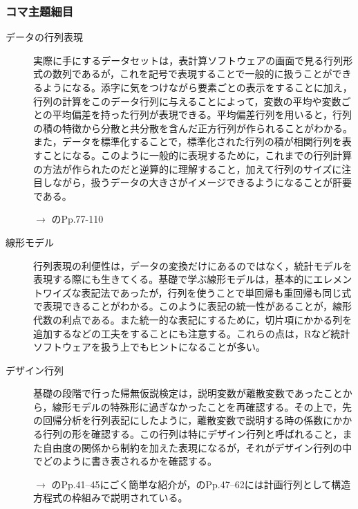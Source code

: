 \subsubsection{コマ主題細目}
\begin{description}
    \item[データの行列表現] 実際に手にするデータセットは，表計算ソフトウェアの画面で見る行列形式の数列であるが，これを記号で表現することで一般的に扱うことができるようになる。添字に気をつけながら要素ごとの表示をすることに加え，行列の計算をこのデータ行列に与えることによって，変数の平均や変数ごとの平均偏差を持った行列が表現できる。平均偏差行列を用いると，行列の積の特徴から分散と共分散を含んだ正方行列が作られることがわかる。また，データを標準化することで，標準化された行列の積が相関行列を表すことになる。このように一般的に表現するために，これまでの行列計算の方法が作られたのだと逆算的に理解すること，加えて行列のサイズに注目しながら，扱うデータの大きさがイメージできるようになることが肝要である。

    \begin{flushright}
        $\to$ \citet{岡太200804}のPp.77-110
    \end{flushright}

    \item[線形モデル] 行列表現の利便性は，データの変換だけにあるのではなく，統計モデルを表現する際にも生きてくる。基礎で学ぶ線形モデルは，基本的にエレメントワイズな表記法であったが，行列を使うことで単回帰も重回帰も同じ式で表現できることがわかる。このように表記の統一性があることが，線形代数の利点である。また統一的な表記にするために，切片項にかかる列を追加するなどの工夫をすることにも注意する。これらの点は，Rなど統計ソフトウェアを扱う上でもヒントになることが多い。

    \item[デザイン行列] 基礎の段階で行った帰無仮説検定は，説明変数が離散変数であったことから，線形モデルの特殊形に過ぎなかったことを再確認する。その上で，先の回帰分析を行列表記にしたように，離散変数で説明する時の係数にかかる行列の形を確認する。この行列は特にデザイン行列と呼ばれること，また自由度の関係から制約を加えた表現になるが，それがデザイン行列の中でどのように書き表されるかを確認する。

     \begin{flushright}
        $\to$ \citet{Annette_J_Dobson2008-09-08}のPp.41--45にごく簡単な紹介が，\citet{豊田秀樹2000-04-01}のPp.47--62には計画行列として構造方程式の枠組みで説明されている。
    \end{flushright}   
    

\end{description}

